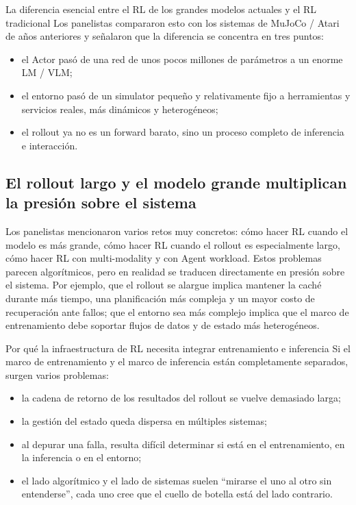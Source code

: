 \documentclass[a4paper]{article}
\begin{document}
\begin{importantbox}{La diferencia esencial entre el RL de los grandes modelos actuales y el RL tradicional}
Los panelistas compararon esto con los sistemas de MuJoCo / Atari de años anteriores y señalaron que la diferencia se concentra en tres puntos:
\begin{itemize}
  \item el Actor pasó de una red de unos pocos millones de parámetros a un enorme LM / VLM;
  \item el entorno pasó de un simulator pequeño y relativamente fijo a herramientas y servicios reales, más dinámicos y heterogéneos;
  \item el rollout ya no es un forward barato, sino un proceso completo de inferencia e interacción.
\end{itemize}
\end{importantbox}

\subsection{El rollout largo y el modelo grande multiplican la presión sobre el sistema}
Los panelistas mencionaron varios retos muy concretos: cómo hacer RL cuando el modelo es más grande, cómo hacer RL cuando el rollout es especialmente largo, cómo hacer RL con multi-modality y con Agent workload. Estos problemas parecen algorítmicos, pero en realidad se traducen directamente en presión sobre el sistema. Por ejemplo, que el rollout se alargue implica mantener la caché durante más tiempo, una planificación más compleja y un mayor costo de recuperación ante fallos; que el entorno sea más complejo implica que el marco de entrenamiento debe soportar flujos de datos y de estado más heterogéneos.

\begin{knowledgebox}{Por qué la infraestructura de RL necesita integrar entrenamiento e inferencia}
Si el marco de entrenamiento y el marco de inferencia están completamente separados, surgen varios problemas:
\begin{itemize}
  \item la cadena de retorno de los resultados del rollout se vuelve demasiado larga;
  \item la gestión del estado queda dispersa en múltiples sistemas;
  \item al depurar una falla, resulta difícil determinar si está en el entrenamiento, en la inferencia o en el entorno;
  \item el lado algorítmico y el lado de sistemas suelen ``mirarse el uno al otro sin entenderse'', cada uno cree que el cuello de botella está del lado contrario.
\end{itemize}
\end{knowledgebox}
\end{document}
